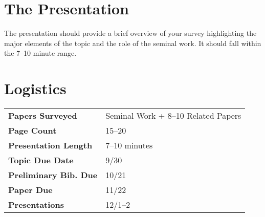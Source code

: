 \documentclass[nobib]{tufte-handout}
\begin{document}
\section{The Presentation}

The presentation should provide a brief overview of your survey highlighting the major elements of the topic and the role of the seminal work. It should fall within the 7--10 minute range.

\section{Logistics}

\begin{tabular}{ll}
  \textbf{Papers Surveyed} & Seminal Work + 8--10 Related Papers \\
  \textbf{Page Count} & 15--20 \\
  \textbf{Presentation Length} & 7--10 minutes \\
  \textbf{Topic Due Date} & 9/30 \\
  \textbf{Preliminary Bib. Due} & 10/21 \\
  \textbf{Paper Due} & 11/22 \\
  \textbf{Presentations} & 12/1--2
\end{tabular}
\end{document}
